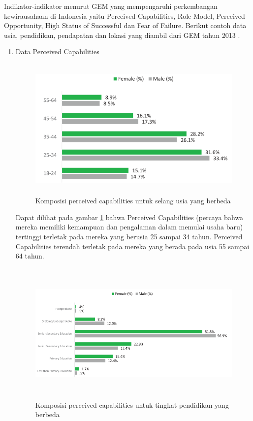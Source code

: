 Indikator-indikator menurut GEM yang mempengaruhi perkembangan kewirausahaan di Indonesia yaitu Perceived Capabilities, Role Model, Perceived Opportunity, High Status of Successful dan Fear of Failure. Berikut contoh data usia, pendidikan, pendapatan dan lokasi yang diambil dari GEM tahun 2013 \cite{GEM2013}. 

\begin{enumerate}
	\item Data Perceived Capabilities
\begin{figure} [H]
	\centering  
	\includegraphics[width=14cm, height=7cm]{umurPC2013} 
	\caption[Komposisi perceived capabilities untuk selang usia yang berbeda]{Komposisi perceived capabilities untuk selang usia yang berbeda} 
	\label{fig:PCUmur} 
\end{figure}

Dapat dilihat pada gambar \ref{fig:PCUmur} bahwa Perceived Capabilities (percaya bahwa mereka memiliki kemampuan dan pengalaman dalam memulai usaha baru) tertinggi terletak pada mereka yang berusia 25 sampai 34 tahun. Perceived Capabilities terendah terletak pada mereka yang berada pada usia 55 sampai 64 tahun.

\begin{figure} [H]
	\centering  
	\includegraphics[width=14cm, height=7cm]{pendidikanPC2013} 
	\caption[Komposisi perceived capabilities untuk tingkat pendidikan yang berbeda]{Komposisi perceived capabilities untuk tingkat pendidikan yang berbeda} 
	\label{fig:PCPendidikan} 
\end{figure}


\end{enumerate}
